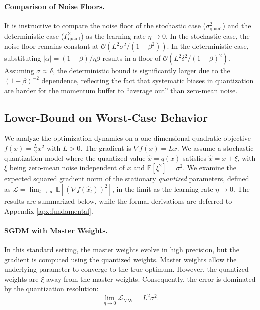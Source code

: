 \documentclass[11pt, a4paper, onecolumn, copyright, goog]{google}
\newcommand{\E}{\mathbb{E}}
\theoremstyle{plain}
\theoremstyle{definition}
\theoremstyle{remark}
\begin{document}
\paragraph{Comparison of Noise Floors.}
It is instructive to compare the noise floor of the stochastic case ($\sigma_{\text{quant}}^2$) and the deterministic case ($\Gamma_{\text{quant}}^2$) as the learning rate $\eta \to 0$. In the stochastic case, the noise floor remains constant at $\mathcal{O}(L^2 \sigma^2 / (1-\beta^2))$. In the deterministic case, substituting $|\alpha| = (1-\beta)/\eta \beta$ results in a floor of $\mathcal{O}(L^2 \delta^2 / (1-\beta)^2)$. Assuming $\sigma \approx \delta$, the deterministic bound is significantly larger due to the $(1-\beta)^{-2}$ dependence, reflecting the fact that systematic biases in quantization are harder for the momentum buffer to ``average out'' than zero-mean noise.

\subsection{Lower-Bound on  Worst-Case Behavior}
\label{sec:fundamental}
We analyze the optimization dynamics on a one-dimensional quadratic objective $f(x) = \frac{L}{2} x^2$ with $L > 0$. The gradient is $\nabla f(x) = Lx$. We assume a stochastic quantization model where the quantized value $\hat{x} = q(x)$ satisfies $\hat{x} = x + \xi$, with $\xi$ being zero-mean noise independent of $x$ and $\E[\xi^2] = \sigma^2$. We examine the expected squared gradient norm of the stationary \textit{quantized} parameters, defined as $\mathcal{L} = \lim_{t \to \infty} \E[(\nabla f(\hat{x}_t))^2]$, in the limit as the learning rate $\eta \to 0$. The results are summarized below, while the formal derivations are deferred to Appendix \ref{apx:fundamental}.

\paragraph{SGDM with Master Weights.}
In this standard setting, the master weights evolve in high precision, but the gradient is computed using the quantized weights. Master weights allow the underlying parameter to converge to the true optimum. However, the quantized weights are $\xi$ away from the master weights. Consequently, the error is dominated by the quantization resolution:
\begin{equation}
    \lim_{\eta \to 0} \mathcal{L}_{\text{MW}} = L^2 \sigma^2.
\end{equation}
\end{document}
